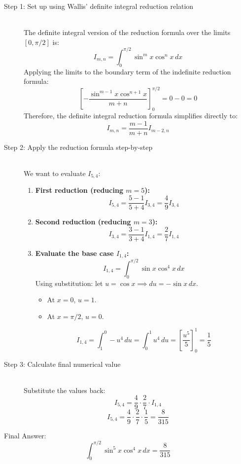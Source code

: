 \documentclass[11pt, a4paper]{article}
\begin{document}
\begin{description}
    \item[Step 1: Set up using Wallis' definite integral reduction relation] \ \\
    The definite integral version of the reduction formula over the limits $[0, \pi/2]$ is:
    \[ I_{m, n} = \int_{0}^{\pi/2} \sin^m x \cos^n x \, dx \]
    Applying the limits to the boundary term of the indefinite reduction formula:
    \[ \left[ -\frac{\sin^{m-1} x \cos^{n+1} x}{m+n} \right]_{0}^{\pi/2} = 0 - 0 = 0 \]
    Therefore, the definite integral reduction formula simplifies directly to:
    \[ I_{m, n} = \frac{m-1}{m+n} I_{m-2, n} \]

    \item[Step 2: Apply the reduction formula step-by-step] \ \\
    We want to evaluate $I_{5, 4}$:
    \begin{enumerate}
        \item \textbf{First reduction (reducing $m=5$):}
        \[ I_{5, 4} = \frac{5-1}{5+4} I_{3, 4} = \frac{4}{9} I_{3, 4} \]
        
        \item \textbf{Second reduction (reducing $m=3$):}
        \[ I_{3, 4} = \frac{3-1}{3+4} I_{1, 4} = \frac{2}{7} I_{1, 4} \]
        
        \item \textbf{Evaluate the base case $I_{1, 4}$:}
        \[ I_{1, 4} = \int_{0}^{\pi/2} \sin x \cos^4 x \, dx \]
        Using substitution: let $u = \cos x \implies du = -\sin x \, dx$.
        \begin{itemize}
            \item At $x=0$, $u = 1$.
            \item At $x=\pi/2$, $u = 0$.
        \end{itemize}
        \[ I_{1, 4} = \int_{1}^{0} -u^4 \, du = \int_{0}^{1} u^4 \, du = \left[ \frac{u^5}{5} \right]_{0}^{1} = \frac{1}{5} \]
    \end{enumerate}

    \item[Step 3: Calculate final numerical value] \ \\
    Substitute the values back:
    \[ I_{5, 4} = \frac{4}{9} \cdot \frac{2}{7} \cdot I_{1, 4} \]
    \[ I_{5, 4} = \frac{4}{9} \cdot \frac{2}{7} \cdot \frac{1}{5} = \frac{8}{315} \]
\end{description}

Final Answer:
\[ 
\boxed{\int_{0}^{\pi/2} \sin^5 x \cos^4 x \, dx = \frac{8}{315}} 
\]

\end{document}
